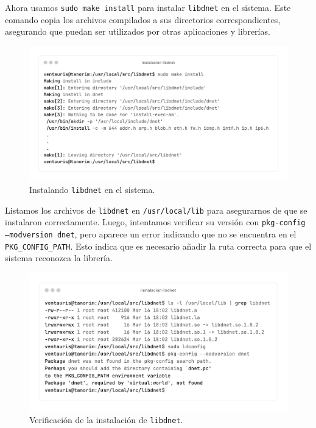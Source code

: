\documentclass[12pt,a4paper]{report}
\begin{document}
\newpage

Ahora usamos \texttt{sudo make install} para instalar \texttt{libdnet} en el sistema. Este comando copia los archivos compilados a sus directorios correspondientes, asegurando que puedan ser utilizados por otras aplicaciones y librerías.

\begin{figure}[H]
	\centering
	\includegraphics[scale=0.12]{instalacion_snort/5-5.png}
	\caption{Instalando \texttt{libdnet} en el sistema.}
\end{figure}

Listamos los archivos de \texttt{libdnet} en \texttt{/usr/local/lib} para asegurarnos de que se instalaron correctamente. Luego, intentamos verificar su versión con \texttt{pkg-config --modversion dnet}, pero aparece un error indicando que no se encuentra en el \texttt{PKG\_CONFIG\_PATH}. Esto indica que es necesario añadir la ruta correcta para que el sistema reconozca la librería.

\begin{figure}[H]
	\centering
	\includegraphics[scale=0.12]{instalacion_snort/6-6.png}
	\caption{Verificación de la instalación de \texttt{libdnet}.}
\end{figure}
\end{document}

